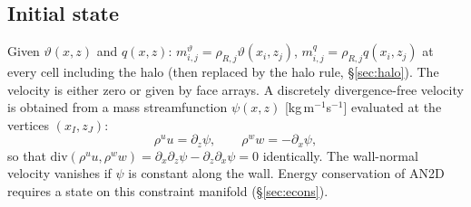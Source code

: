 \documentclass[11pt,a4paper]{article}
\newcommand{\vt}{\vartheta}                    %
\begin{document}
\subsection{Initial state}
Given $\vt(x,z)$ and $q(x,z)$: $m^\vt_{i,j}=\rho_{R,j}\vt(x_i,z_j)$, $m^q_{i,j}=\rho_{R,j}q(x_i,z_j)$ at every cell including the halo (then replaced by the halo rule, \S\ref{sec:halo}). The velocity is either zero or given by face arrays. A discretely divergence-free velocity is obtained from a mass streamfunction $\psi(x,z)$ [kg\,m$^{-1}$s$^{-1}$] evaluated at the vertices $(x_I,z_J)$:
\begin{equation}
  \rho^uu=\partial_z\psi,\qquad \rho^ww=-\partial_x\psi,
\end{equation}
so that $\mathrm{div}(\rho^uu,\rho^ww)=\partial_x\partial_z\psi-\partial_z\partial_x\psi=0$ identically. The wall-normal velocity vanishes if $\psi$ is constant along the wall.
Energy conservation of AN2D requires a state on this constraint manifold (\S\ref{sec:econs}).
\end{document}
